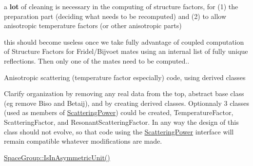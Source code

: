 \begin{DoxyRefList}
\label{todo__todo000010}%
%
a {\bfseries{lot}} of cleaning is necessary in the computing of structure factors, for (1) the \textquotesingle{}preparation\textquotesingle{} part (deciding what needs to be recomputed) and (2) to allow anisotropic temperature factors (or other anisotropic parts)  
\item[Member \mbox{\hyperlink{class_obj_cryst_1_1_scattering_data_ae126b860d309daa78e975b8b6d8a3ec0}{Obj\+Cryst::Scattering\+Data::Set\+Is\+Ignoring\+Imag\+Scatt\+Fact}} (const bool b)]\label{todo__todo000011}%
%
this should become useless once we take fully advantage of coupled computation of Structure Factors for Fridel/\+Bijvoet mates using an internal list of \textquotesingle{}fully unique\textquotesingle{} reflections. Then only one of the mates need to be computed..  
\item[Class \mbox{\hyperlink{class_obj_cryst_1_1_scattering_power}{Obj\+Cryst::Scattering\+Power}} ]\label{todo__todo000012}%
%
Anisotropic scattering (temperature factor especially) code, using derived classes 

Clarify organization by removing any \textquotesingle{}real\textquotesingle{} data from the top, abstract base class (eg remove Biso and Betaij), and by creating derived classes. Optionnaly 3 classes (used as members of \mbox{\hyperlink{class_obj_cryst_1_1_scattering_power}{Scattering\+Power}}) could be created, Temperature\+Factor, Scattering\+Factor, and Resonant\+Scattering\+Factor. In any way the design of this class should not evolve, so that code using the \mbox{\hyperlink{class_obj_cryst_1_1_scattering_power}{Scattering\+Power}} interface will remain compatible whatever modifications are made.  
\item[Member \mbox{\hyperlink{class_obj_cryst_1_1_space_group_a11651737de9e6ba328fffacce8a46b5a}{Obj\+Cryst::Space\+Group::Change\+To\+Asymmetric\+Unit}} (R\+E\+AL x, R\+E\+AL y, R\+E\+AL z) const]\label{todo__todo000014}%
%
\mbox{\hyperlink{class_obj_cryst_1_1_space_group_ad69342f0b97ad491c7aa5cb5061e9261}{Space\+Group\+::\+Is\+In\+Asymmetric\+Unit()}}  
\item[Member \mbox{\hyperlink{class_obj_cryst_1_1_space_group_a3c71572bb11403564630db165a5ed1cc}{Obj\+Cryst::Space\+Group::Print}} () const]\label{todo__todo000015}%
%
 

\end{DoxyRefList}
